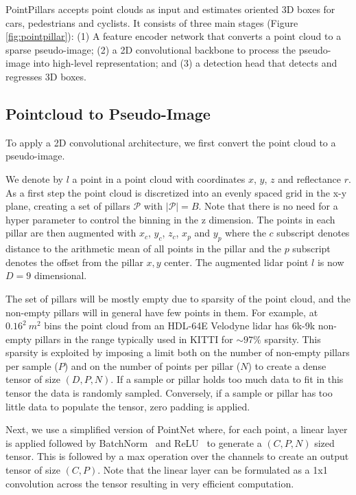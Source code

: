 \documentclass[10pt,twocolumn,letterpaper]{article}
\newcommand{\figref}[1]{Figure \ref{#1}}
\begin{document}
PointPillars accepts point clouds as input and estimates oriented 3D boxes for cars, pedestrians and cyclists.
It consists of three main stages (\figref{fig:pointpillar}):
(1) A feature encoder network that converts a point cloud to a sparse pseudo-image;
(2) a 2D convolutional backbone to process the pseudo-image into high-level representation; and
(3) a detection head that detects and regresses 3D boxes.

\subsection{Pointcloud to Pseudo-Image}
\label{sec:pointpillars}
\label{sec:create-stacked-pillars}
To apply a 2D convolutional architecture, we first convert the point cloud to a pseudo-image.

We denote by $l$ a point in a point cloud with coordinates $x$, $y$, $z$ and reflectance $r$.
As a first step the point cloud is discretized into an evenly spaced grid in the x-y plane, creating a set of pillars $\mathcal{P}$ with $|\mathcal{P}| = B$.
Note that there is no need for a hyper parameter to control the binning in the z dimension.
The points in each pillar are then augmented with $x_{c}$, $y_{c}$, $z_{c}$, $x_{p}$ and $y_{p}$ where the $c$ subscript denotes distance to the arithmetic mean of all points in the pillar and the $p$ subscript denotes the offset from the pillar $x, y$ center. The augmented lidar point $l$ is now $D=9$ dimensional.

The set of pillars will be mostly empty due to sparsity of the point cloud, and the non-empty pillars will in general have few points in them.
For example, at $0.16^2~m^2$ bins the point cloud from an HDL-64E Velodyne lidar has 6k-9k non-empty pillars in the range typically used in KITTI for $\sim 97\%$ sparsity.
This sparsity is exploited by imposing a limit both on the number of non-empty pillars per sample ($P$) and on the number of points per pillar ($N$) to create a dense tensor of size $(D, P, N)$. 
If a sample or pillar holds too much data to fit in this tensor the data is randomly sampled. 
Conversely, if a sample or pillar has too little data to populate the tensor, zero padding is applied.

Next, we use a simplified version of PointNet where, for each point, a linear layer is applied followed by BatchNorm~\cite{batchnorm} and ReLU~\cite{relu} to generate a $(C, P, N)$ sized tensor. 
This is followed by a max operation over the channels to create an output tensor of size $(C, P)$. 
Note that the linear layer can be formulated as a 1x1 convolution across the tensor resulting in very efficient computation.
\end{document}
